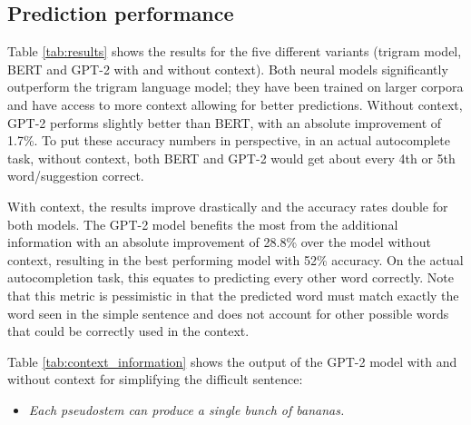\documentclass[11pt]{article}
\begin{document}
\begin{table}[t]
\centering
{}
\caption{Accuracy for the different models on the Wikipedia test corpus of 450 sentence pairs.  Context-aware approaches included the context of the difficult sentence when predicting.} 
\label{tab:results}
\end{table}

\subsection{Prediction performance}
Table \ref{tab:results} shows the results for the five different variants (trigram model, BERT and GPT-2 with and without context).  Both neural models significantly outperform the trigram language model; they have been trained on larger corpora and have access to more context allowing for better predictions.  Without context, GPT-2 performs slightly better than BERT, with an absolute improvement of 1.7\%.  To put these accuracy numbers in perspective, in an actual autocomplete task, without context, both BERT and GPT-2 would get about every 4th or 5th word/suggestion correct.

With context, the results improve drastically and the accuracy rates double for both models.  The GPT-2 model benefits the most from the additional information with an absolute improvement of 28.8\% over the model without context, resulting in the best performing model with 52\% accuracy.  On the actual autocompletion task, this equates to predicting every other word correctly.  Note that this metric is pessimistic in that the predicted word must match exactly the word seen in the simple sentence and does not account for other possible words that could be correctly used in the context.

Table \ref{tab:context_information} shows the output of the GPT-2 model with and without context for simplifying the difficult sentence:

\begin{itemize}
    \item[] \textit{Each pseudostem can produce a single bunch of bananas.}
\end{itemize}
\end{document}
